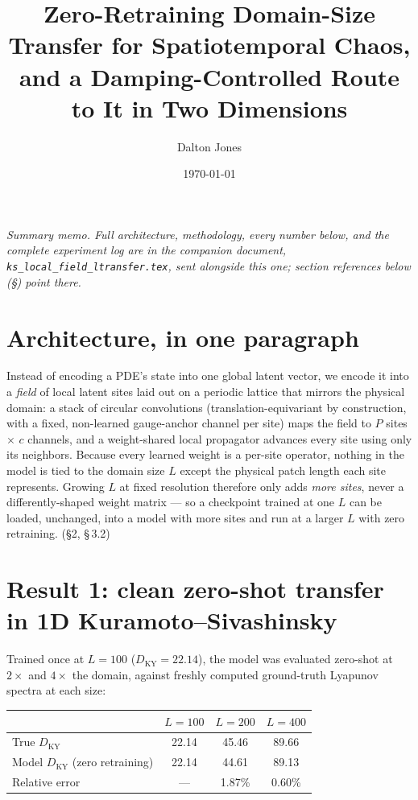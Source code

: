 \documentclass[11pt]{article}
\title{\vspace{-1em}Zero-Retraining Domain-Size Transfer for Spatiotemporal
Chaos, and a Damping-Controlled Route to It in Two Dimensions}
\author{Dalton Jones}
\date{\today}
\newcommand{\DKY}{D_{\mathrm{KY}}}
\begin{document}
\maketitle
\vspace{-2em}

\noindent\textit{Summary memo. Full architecture, methodology, every
number below, and the complete experiment log are in the companion
document, \texttt{ks\_local\_field\_ltransfer.tex}, sent alongside this
one; section references below (\S) point there.}

\section{Architecture, in one paragraph}

Instead of encoding a PDE's state into one global latent vector, we
encode it into a \emph{field} of local latent sites laid out on a
periodic lattice that mirrors the physical domain: a stack of circular
convolutions (translation-equivariant by construction, with a fixed,
non-learned gauge-anchor channel per site) maps the field to
$P$ sites $\times$ $c$ channels, and a weight-shared local propagator
advances every site using only its neighbors. Because every learned
weight is a per-site operator, nothing in the model is tied to the
domain size $L$ except the physical patch length each site represents.
Growing $L$ at fixed resolution therefore only adds \emph{more sites},
never a differently-shaped weight matrix --- so a checkpoint trained at
one $L$ can be loaded, unchanged, into a model with more sites and run
at a larger $L$ with zero retraining. (\S2, \S\,3.2)

\section{Result 1: clean zero-shot transfer in 1D Kuramoto--Sivashinsky}

Trained once at $L{=}100$ ($\DKY{=}22.14$), the model was evaluated
zero-shot at $2\times$ and $4\times$ the domain, against freshly
computed ground-truth Lyapunov spectra at each size:

\begin{center}
\begin{tabular}{lccc}
\toprule
 & $L=100$ & $L=200$ & $L=400$ \\
\midrule
True $\DKY$ & 22.14 & 45.46 & 89.66 \\
Model $\DKY$ (zero retraining) & 22.14 & 44.61 & 89.13 \\
Relative error & --- & 1.87\% & 0.60\% \\
\bottomrule
\end{tabular}
\end{center}
\end{document}
